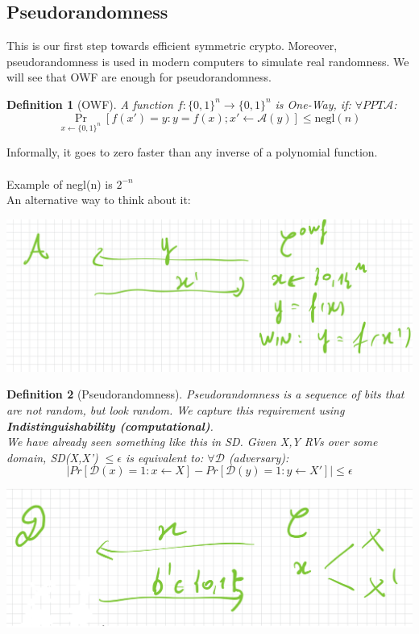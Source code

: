 \documentclass[11pt, a4paper]{article}
\newtheorem{defn}{Definition}
\begin{document}
\subsection{Pseudorandomness}
This is our first step towards efficient symmetric crypto. Moreover, pseudorandomness is used in modern computers to simulate real randomness. We will see that OWF are enough for pseudorandomness.\\
\begin{defn}[OWF]
    A function $f :\{0,1\}^n \rightarrow \{0,1\}^n$ is One-Way, if: $\forall PPT \mathcal{A}$:
    $$\Pr_{x \leftarrow\{0,1\}^n}[f(x')= y : y = f(x); x' \leftarrow \mathcal{A}(y)] \leq \text{negl}(n)$$
\end{defn}
Informally, it goes to zero faster than any inverse of a polynomial function.\\\\
Example of negl(n) is $2^{-n}$\\
An alternative way to think about it:
\begin{center}
    \includegraphics[scale=0.4]{img/Comp_sec/Alternative1.png}
\end{center}
\begin{defn}[Pseudorandomness]
    Pseudorandomness is a sequence of bits that are not random, but look random. We capture this requirement using \textbf{Indistinguishability (computational)}.\\
    We have already seen something like this in SD. Given X,Y RVs over some domain, SD(X,X') $\leq \epsilon$ is equivalent to: $\forall \mathcal{D}$ (adversary):
    $$|Pr[\mathcal{D}(x)=1 : x \leftarrow X] - Pr[\mathcal{D}(y)=1 : y \leftarrow X']| \leq \epsilon$$ 
\end{defn}
\begin{center}
    \includegraphics[scale=0.4]{img/Comp_sec/Alt2.png}
\end{center}
\end{document}
